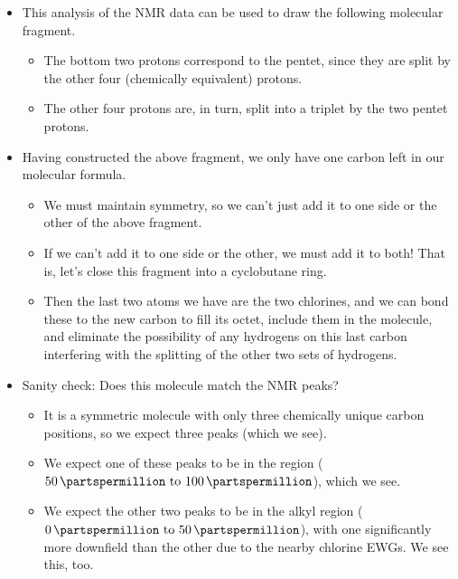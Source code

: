 \documentclass[../notes.tex]{subfiles}
\begin{document}
\begin{itemize}
\begin{itemize}
\begin{itemize}
        \end{itemize}
        \item This analysis of the  NMR data can be used to draw the following molecular fragment.
        \begin{center}
            \footnotesize
        \end{center}
        \begin{itemize}
            \item The bottom two protons correspond to the pentet, since they are split by the other four (chemically equivalent) protons.
            \item The other four protons are, in turn, split into a triplet by the two pentet protons.
        \end{itemize}
        \item Having constructed the above fragment, we only have one carbon left in our molecular formula.
        \begin{itemize}
            \item We must maintain symmetry, so we can't just add it to one side or the other of the above fragment.
            \item If we can't add it to one side or the other, we must add it to both! That is, let's close this fragment into a cyclobutane ring.
            \item Then the last two atoms we have are the two chlorines, and we can bond these to the new carbon to fill its octet, include them in the molecule, and eliminate the possibility of any hydrogens on this last carbon interfering with the splitting of the other two sets of hydrogens.
        \end{itemize}
        \item Sanity check: Does this molecule match the  NMR peaks?
        \begin{itemize}
            \item It is a symmetric molecule with only three chemically unique carbon positions, so we expect three peaks (which we see).
            \item We expect one of these peaks to be in the  region ($\SIrange{50}{100}{\partspermillion}$), which we see.
            \item We expect the other two peaks to be in the alkyl region ($\SIrange{0}{50}{\partspermillion}$), with one significantly more downfield than the other due to the nearby chlorine EWGs. We see this, too.

\end{itemize}
\end{itemize}
\end{itemize}
\end{document}
